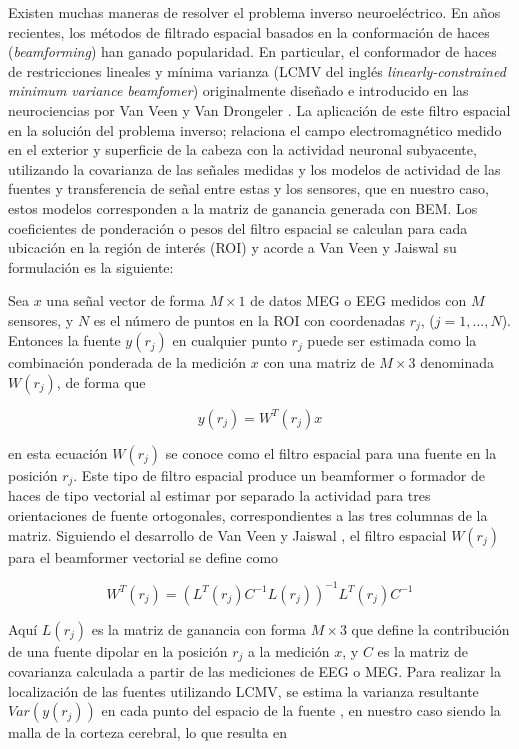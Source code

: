 Existen muchas maneras de resolver el problema inverso neuroeléctrico. En años recientes, los métodos de filtrado espacial basados en la conformación de haces (\emph{beamforming}) han ganado popularidad. En particular, el conformador de haces de restricciones lineales y mínima varianza (LCMV del inglés \emph{linearly-constrained minimum variance beamfomer}) originalmente diseñado e introducido en las neurociencias por Van Veen y Van Drongeler \cite{VanVeen1988, VanVeen1997}. La aplicación de este filtro espacial en la solución del problema inverso; relaciona el campo electromagnético medido en el exterior y superficie de la cabeza con la actividad neuronal subyacente, utilizando la covarianza de las señales medidas y los modelos de actividad de las fuentes y transferencia de señal entre estas y los sensores, que en nuestro caso, estos modelos corresponden a la matriz de ganancia generada con BEM. Los coeficientes de ponderación o pesos del filtro espacial se calculan para cada ubicación en la región de interés (ROI) y acorde a Van Veen y Jaiswal \cite{VanVeen1997,Jaiswal2020} su formulación es la siguiente:

Sea $x$ una señal vector de forma $M \times 1$ de datos MEG o EEG medidos con $M$ sensores, y $N$ es el número de puntos en la ROI con coordenadas $r_j$, ($j = 1, ..., N$). Entonces la fuente $y(r_j)$ en cualquier punto $r_j$ puede ser estimada como la combinación ponderada de la medición $x$ con una matriz de $M \times 3$ denominada $W(r_j)$, de forma que

\begin{equation}
	\label{beamformer}
	y(r_j) = W^{T}(r_j)x
\end{equation}

en esta ecuación $W(r_j)$ se conoce como el filtro espacial para una fuente en la posición $r_j$. Este tipo de filtro espacial produce un beamformer o formador de haces de tipo vectorial al estimar por separado la actividad para tres orientaciones de fuente ortogonales, correspondientes a las tres columnas de la matriz. Siguiendo el desarrollo de Van Veen y Jaiswal \cite{VanVeen1997,Jaiswal2020}, el filtro espacial $W(r_j)$ para el beamformer vectorial se define como

\begin{equation}
	\label{beamformer2}
	W^{T}(r_j) = (L^{T}(r_j)C^{-1}L(r_j))^{-1}L^{T}(r_j)C^{-1}
\end{equation}

Aquí $L(r_j)$ es la matriz de ganancia con forma $M \times 3$ que define la contribución de una fuente dipolar en la posición $r_j$ a la medición $x$, y $C$ es la matriz de covarianza calculada a partir de las mediciones de EEG o MEG. Para realizar la localización de las fuentes utilizando LCMV, se estima la varianza resultante $Var(y(r_j))$ en cada punto del espacio de la fuente \cite{VanVeen1997,Jaiswal2020}, en nuestro caso siendo la malla de la corteza cerebral, lo que resulta en

